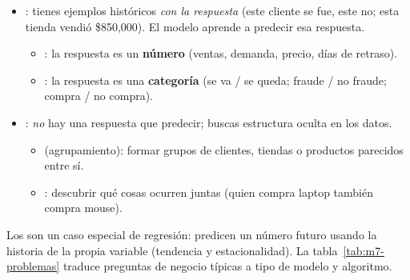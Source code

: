 \begin{itemize}
  \item {}: tienes ejemplos históricos
        \emph{con la respuesta} (este cliente se fue, este no; esta tienda
        vendió \$850{,}000). El modelo aprende a predecir esa respuesta.
        \begin{itemize}
          \item {}: la respuesta es un \textbf{número}
                (ventas, demanda, precio, días de retraso).
          \item {}: la respuesta es una \textbf{categoría}
                (se va / se queda; fraude / no fraude; compra / no compra).
        \end{itemize}
  \item {}: \emph{no} hay una respuesta que
        predecir; buscas estructura oculta en los datos.
        \begin{itemize}
          \item {} (agrupamiento): formar grupos de clientes,
                tiendas o productos parecidos entre sí.
          \item {}: descubrir qué cosas ocurren
                juntas (quien compra laptop también compra mouse).
        \end{itemize}
\end{itemize}

Los  son un caso especial de
regresión: predicen un número futuro usando la historia de la propia variable
(tendencia y estacionalidad). La tabla~\ref{tab:m7-problemas} traduce preguntas
de negocio típicas a tipo de modelo y algoritmo.

